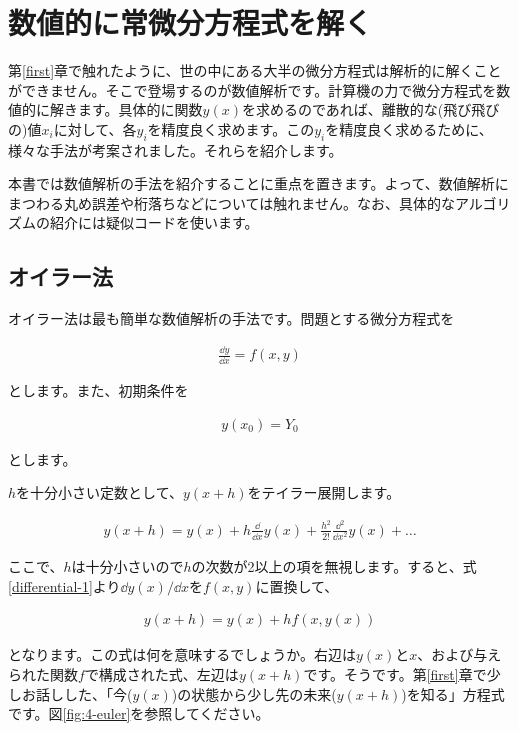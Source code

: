 \chapter{数値的に常微分方程式を解く}
\label{numerical-ordinary}
第\ref{first}章で触れたように、世の中にある大半の微分方程式は解析的に解くことができません。そこで登場するのが数値解析です。計算機の力で微分方程式を数値的に解きます。具体的に関数$y(x)$を求めるのであれば、離散的な(飛び飛びの)値$x_i$に対して、各$y_i$を精度良く求めます。この$y_i$を精度良く求めるために、様々な手法が考案されました。それらを紹介します。

本書では数値解析の手法を紹介することに重点を置きます。よって、数値解析にまつわる丸め誤差や桁落ちなどについては触れません。なお、具体的なアルゴリズムの紹介には疑似コードを使います。






\section{オイラー法}
\label{euler-numerical}
オイラー法は最も簡単な数値解析の手法です。問題とする微分方程式を

\begin{eqnarray}
    \frac{\dd y}{\dd x}=f(x,y)
    \label{differential-1}
\end{eqnarray}

\noindent
とします。また、初期条件を

\begin{eqnarray}
    y(x_0)=Y_0
    \label{terms-1}
\end{eqnarray}

\noindent
とします。

$h$を十分小さい定数として、$y(x+h)$をテイラー展開します。

\begin{eqnarray}
    y(x+h)=y(x)+h\frac{\dd}{\dd x}y(x)+\frac{h^2}{2!}\frac{\dd^2}{\dd x^2}y(x)+\dots
\end{eqnarray}

ここで、$h$は十分小さいので$h$の次数が2以上の項を無視します。すると、式\ref{differential-1}より$\dd y(x)/\dd x$を$f(x,y)$に置換して、

\begin{eqnarray}
    y(x+h)=y(x)+hf(x,y(x))
\end{eqnarray}

\noindent
となります。この式は何を意味するでしょうか。右辺は$y(x)$と$x$、および与えられた関数$f$で構成された式、左辺は$y(x+h)$です。そうです。第\ref{first}章で少しお話しした、「今($y(x)$)の状態から少し先の未来($y(x+h)$)を知る」方程式です。図\ref{fig:4-euler}を参照してください。

